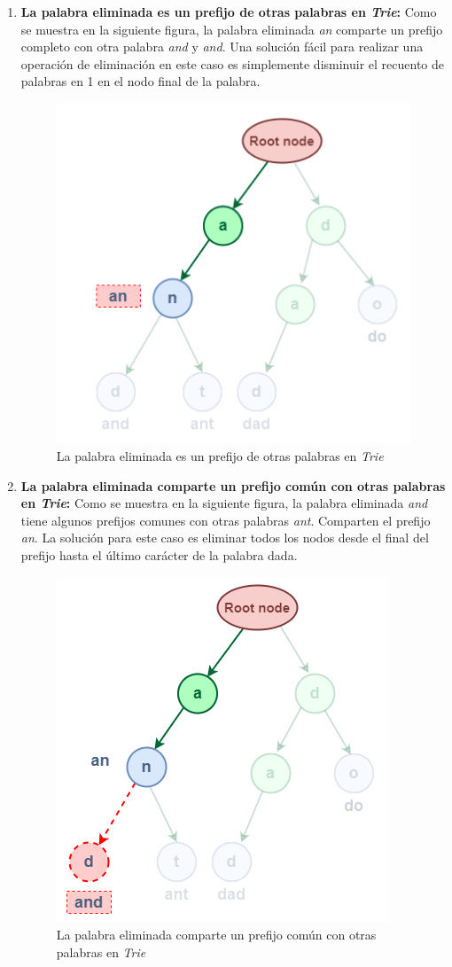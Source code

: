 \begin{enumerate}
	\item \textbf{La palabra eliminada es un prefijo de otras palabras en \emph{Trie}:} Como se muestra en la siguiente figura, la palabra eliminada \emph{an} comparte un prefijo completo con otra palabra \emph{and} y \emph{and}. Una solución fácil para realizar una operación de eliminación en este caso es simplemente disminuir el recuento de palabras en 1 en el nodo final de la palabra.
	
	\begin{figure}[h!]
		\centering
		\includegraphics[width=0.35\linewidth]{img/case1_delete}
		\caption{La palabra eliminada es un prefijo de otras palabras en \emph{Trie}}
		\label{fig:case1delete}
	\end{figure}
	
	\item \textbf{La palabra eliminada comparte un prefijo común con otras palabras en \emph{Trie}:} Como se muestra en la siguiente figura, la palabra eliminada \emph{and} tiene algunos prefijos comunes con otras palabras \emph{ant}. Comparten el prefijo \emph{an}. La solución para este caso es eliminar todos los nodos desde el final del prefijo hasta el último carácter de la palabra dada.
	
		\begin{figure}[h!]
		\centering
		\includegraphics[width=0.35\linewidth]{img/case2_delete}
		\caption{La palabra eliminada comparte un prefijo común con otras palabras en \emph{Trie}}
		\label{fig:case1delete2}
	\end{figure}
	

\end{enumerate}
